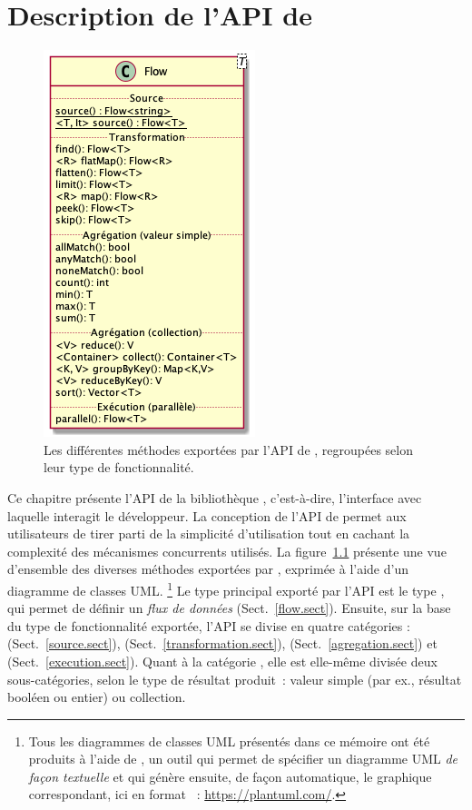 
\chapter{Description de l'API de \PpFf}
\label{description.chap}





\begin{figure}
\centering
     \includegraphics[scale=1.2]{Figures/flow-details.png}
      \caption{Les diff\'erentes m\'ethodes export\'ees par l'{API} de \ppff,
     regroup\'ees selon leur type de fonctionnalit\'e.}
       \label{MethodesAPI.fig}
\end{figure}


Ce chapitre pr\'esente l'API de la biblioth\`eque \ppff,  c'est-\`a-dire, l'interface avec laquelle interagit le d\'eveloppeur. La conception de l'API de \ppff{} permet aux utilisateurs de tirer parti de la simplicit\'e d'utilisation tout en cachant la complexit\'e des m\'ecanismes concurrents utilis\'es. La figure~\ref{MethodesAPI.fig} pr\'esente une vue d'ensemble des diverses m\'ethodes export\'ees par \ppff, exprimée à l'aide d'un diagramme de classes UML.%
%
\footnote{Tous les diagrammes de classes UML présentés dans ce mémoire ont été produits à l'aide de , un outil qui permet de spécifier un diagramme UML \emph{de fa\c{c}on textuelle} et qui génère ensuite, de façon automatique, le graphique correspondant, ici en format ~: \url{https://plantuml.com/}.} 
%
Le type principal exporté par l'API est le type , qui permet de définir un \emph{flux de données} (Sect.~\ref{flow.sect}).
%
Ensuite, sur la base du type de fonctionnalit\'e export\'ee, l'API se divise en quatre cat\'egories :   (Sect.~\ref{source.sect}),  (Sect.~\ref{transformation.sect}),   (Sect.~\ref{agregation.sect}) et  (Sect.~\ref{execution.sect}). Quant \`a la cat\'egorie , elle est elle-m\^eme divis\'ee deux sous-cat\'egories, selon le type de r\'esultat produit~: valeur simple (par ex., r\'esultat bool\'een ou entier) ou collection.

